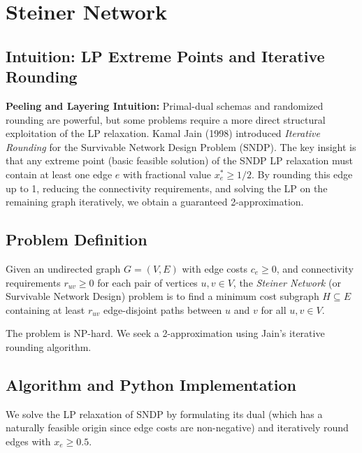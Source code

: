 \setcounter{chapter}{21}
\chapter{Steiner Network}
\label{ch:steiner_network}

\section{Intuition: LP Extreme Points and Iterative Rounding}

\begin{intuitionbox}
\textbf{Peeling and Layering Intuition:} Primal-dual schemas and randomized rounding are powerful, but some problems require a more direct structural exploitation of the LP relaxation. Kamal Jain (1998) introduced \emph{Iterative Rounding} for the Survivable Network Design Problem (SNDP). The key insight is that any extreme point (basic feasible solution) of the SNDP LP relaxation must contain at least one edge $e$ with fractional value $x_e^* \ge 1/2$. By rounding this edge up to 1, reducing the connectivity requirements, and solving the LP on the remaining graph iteratively, we obtain a guaranteed 2-approximation.
\end{intuitionbox}

\section{Problem Definition}
Given an undirected graph $G = (V, E)$ with edge costs $c_e \ge 0$, and connectivity requirements $r_{uv} \ge 0$ for each pair of vertices $u, v \in V$, the \emph{Steiner Network} (or Survivable Network Design) problem is to find a minimum cost subgraph $H \subseteq E$ containing at least $r_{uv}$ edge-disjoint paths between $u$ and $v$ for all $u, v \in V$.

The problem is NP-hard. We seek a 2-approximation using Jain's iterative rounding algorithm.

\section{Algorithm and Python Implementation}
We solve the LP relaxation of SNDP by formulating its dual (which has a naturally feasible origin since edge costs are non-negative) and iteratively round edges with $x_e \ge 0.5$.

